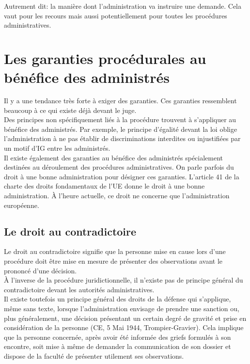 \documentclass[10pt, a4paper, openany]{book}
\begin{document}
Autrement dit: la manière dont l'administration va instruire une demande. Cela vaut pour les recours mais aussi potentiellement pour toutes les procédures administratives. 

\section{Les garanties procédurales au bénéfice des administrés}

Il y a une tendance très forte à exiger des garanties. Ces garanties ressemblent beaucoup à ce qui existe déjà devant le juge. \\
Des principes non spécifiquement liés à la procédure trouvent à s'appliquer au bénéfice des administrés. Par exemple, le principe d'égalité devant la loi oblige l'administration à ne pas établir de discriminations interdites ou injustifiées par un motif d'IG entre les administrés. \\
Il existe également des garanties au bénéfice des administrés spécialement destinées au déroulement des procédures administratives. On parle parfois du droit à une bonne administration pour désigner ces garanties. L'article 41 de la charte des droits fondamentaux de l'UE donne le droit à une bonne administration. À l'heure actuelle, ce droit ne concerne que l'administration européenne. 

\subsection{Le droit au contradictoire}

Le droit au contradictoire signifie que la personne mise en cause lors d'une procédure doit être mise en mesure de présenter des observations avant le prononcé d'une décision.\\
À l'inverse de la procédure juridictionnelle, il n'existe pas de principe général du contradictoire devant les autorités administratives. \\
Il existe toutefois un principe général des droits de la défense qui s'applique, même sans texte, lorsque l'administration envisage de prendre une sanction ou, plus généralement, une décision présentant un certain degré de gravité et prise en considération de la personne (CE, 5 Mai 1944, Trompier-Gravier). Cela implique que la personne concernée, après avoir été informée des griefs formulés à son encontre, soit mise à même de demander la communication de son dossier et dispose de la faculté de présenter utilement ses observations.
\end{document}
